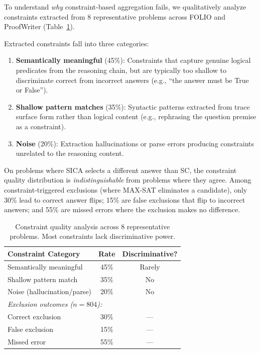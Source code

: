\documentclass[11pt,a4paper]{article}
\begin{document}
To understand \emph{why} constraint-based aggregation fails, we qualitatively analyze constraints extracted from 8 representative problems across FOLIO and ProofWriter (Table~\ref{tab:constraint_quality}).

Extracted constraints fall into three categories:

\begin{enumerate}
\item \textbf{Semantically meaningful} (45\%): Constraints that capture genuine logical predicates from the reasoning chain, but are typically too shallow to discriminate correct from incorrect answers (e.g., ``the answer must be True or False'').

\item \textbf{Shallow pattern matches} (35\%): Syntactic patterns extracted from trace surface form rather than logical content (e.g., rephrasing the question premise as a constraint).

\item \textbf{Noise} (20\%): Extraction hallucinations or parse errors producing constraints unrelated to the reasoning content.
\end{enumerate}

On problems where SICA selects a different answer than SC, the constraint quality distribution is \emph{indistinguishable} from problems where they agree.
Among constraint-triggered exclusions (where MAX-SAT eliminates a candidate), only 30\% lead to correct answer flips; 15\% are false exclusions that flip to incorrect answers; and 55\% are missed errors where the exclusion makes no difference.

\begin{table}[t]
\centering
\small
\begin{tabular}{lcc}
\toprule
\textbf{Constraint Category} & \textbf{Rate} & \textbf{Discriminative?} \\
\midrule
Semantically meaningful & 45\% & Rarely \\
Shallow pattern match & 35\% & No \\
Noise (hallucination/parse) & 20\% & No \\
\midrule
\multicolumn{3}{l}{\emph{Exclusion outcomes ($n=804$):}} \\
Correct exclusion & 30\% & --- \\
False exclusion & 15\% & --- \\
Missed error & 55\% & --- \\
\bottomrule
\end{tabular}
\caption{Constraint quality analysis across 8 representative problems. Most constraints lack discriminative power.}
\label{tab:constraint_quality}
\end{table}
\end{document}
